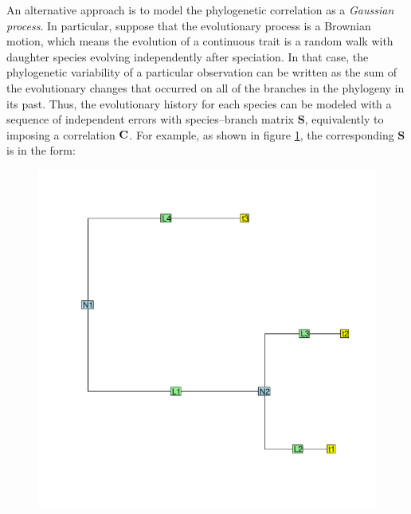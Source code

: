 \documentclass[12pt]{article}
\begin{document}
\newcommand{\bS}{{\mathbf S}}
\newcommand{\bJ}{{\mathbf J}}
\newcommand{\bB}{{\mathbf B}}
\newcommand{\bBadj}{{\mathbf B}_{\mbox{\tiny adj}}}
\newcommand{\bomega}{{\boldsymbol \omega}}
\newcommand{\bell}{{\boldsymbol \ell}}
\newcommand{\e}{{ \epsilon}}

An alternative approach is to model the phylogenetic correlation as a \textit{Gaussian process}. 
In particular, suppose that the evolutionary process is a Brownian motion, which means the evolution of a continuous trait is a random walk with daughter species evolving independently after speciation.  
In that case, the phylogenetic variability of a particular observation can be written as the sum of the evolutionary changes that occurred on all of the branches in the phylogeny in its past. 
Thus, the evolutionary history for each species can be modeled with a sequence of independent errors with species--branch matrix $\bS$, equivalently to imposing a correlation ${\mathbf C}$.
For example, as shown in figure \ref{fig:tree}, the corresponding $\bS$ is in the form:

\begin{center}
\begin{figure}[h]
  \includegraphics[scale=0.8,page=1]{./git_push/tree.pdf}
  \caption{}
\label{fig:tree}
\end{figure}
\end{center}
\end{document}
